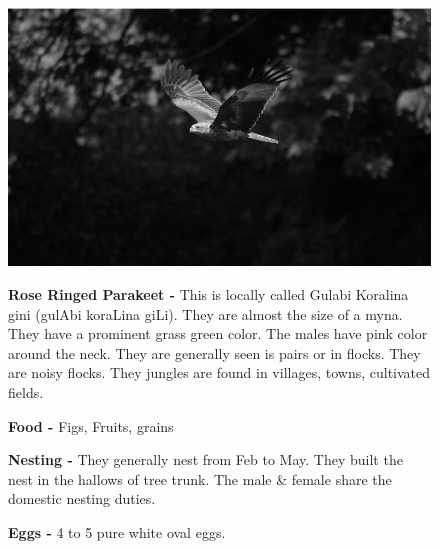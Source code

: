\begin{figure}[H]
\begin{center}
\includegraphics{figure/Land_birds/01_pariah_kite/pariah-kite.eps}
\end{center}
\medskip
\noindent
{\bf Rose Ringed Parakeet -} This is locally called Gulabi Koralina gini ({\kan gulAbi koraLina giLi}). They are almost the size of a myna. They have a prominent grass green color. The males have pink color around the neck. They are generally seen is pairs or in flocks. They are noisy flocks. They jungles are found in villages, towns, cultivated fields.


\medskip
{\bf Food -} Figs, Fruits, grains 

{\bf Nesting -} They generally nest from Feb to May. They built the nest in the hallows of tree trunk. The male \& female share the domestic nesting duties.

{\bf Eggs -} 4 to 5 pure white oval eggs.
\end{figure}

\vfill\eject

~\phantom{a}
\vfill

